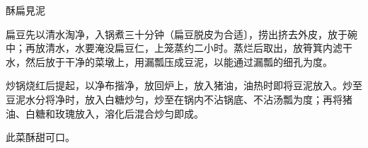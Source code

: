 \begin{recipe}{酥扁見泥}

\ingredients


\cooking

\step 扁豆先以清水淘净，入锅煮三十分钟（扁豆脱皮为合适〕，捞出挤去外皮，放于碗中；再放清水，水要淹没扁豆仁，上笼蒸约二小时。蒸烂后取出，放筲箕内滤干水，然后放于干净的菜墩上，用漏瓢压成豆泥，以能通过漏瓢的细孔为度。

\step 炒锅烧红后提起，以净布揩净，放回炉上，放入猪油，油热时即将豆泥放入。炒至豆泥水分将净时，放入白糖炒匀，炒至在锅内不沾锅底、不沾汤瓢为度；再将猪油、白糖和玫瑰放入，溶化后混合炒匀即成。

\notes

此菜酥甜可口。

\end{recipe}

